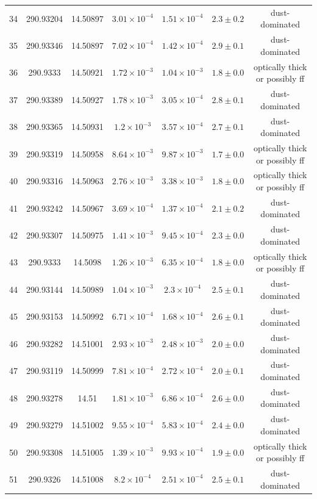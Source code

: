 \begin{table}
\begin{tabular}{ccccccc}
34 & 290.93204 & 14.50897 & $3.01\times10^{-4}$ & $1.51\times10^{-4}$ & $2.3\pm0.2$ & dust-dominated \\
35 & 290.93346 & 14.50897 & $7.02\times10^{-4}$ & $1.42\times10^{-4}$ & $2.9\pm0.1$ & dust-dominated \\
36 & 290.9333 & 14.50921 & $1.72\times10^{-3}$ & $1.04\times10^{-3}$ & $1.8\pm0.0$ & optically thick or possibly ff \\
37 & 290.93389 & 14.50927 & $1.78\times10^{-3}$ & $3.05\times10^{-4}$ & $2.8\pm0.1$ & dust-dominated \\
38 & 290.93365 & 14.50931 & $1.2\times10^{-3}$ & $3.57\times10^{-4}$ & $2.7\pm0.1$ & dust-dominated \\
39 & 290.93319 & 14.50958 & $8.64\times10^{-3}$ & $9.87\times10^{-3}$ & $1.7\pm0.0$ & optically thick or possibly ff \\
40 & 290.93316 & 14.50963 & $2.76\times10^{-3}$ & $3.38\times10^{-3}$ & $1.8\pm0.0$ & optically thick or possibly ff \\
41 & 290.93242 & 14.50967 & $3.69\times10^{-4}$ & $1.37\times10^{-4}$ & $2.1\pm0.2$ & dust-dominated \\
42 & 290.93307 & 14.50975 & $1.41\times10^{-3}$ & $9.45\times10^{-4}$ & $2.3\pm0.0$ & dust-dominated \\
43 & 290.9333 & 14.5098 & $1.26\times10^{-3}$ & $6.35\times10^{-4}$ & $1.8\pm0.0$ & optically thick or possibly ff \\
44 & 290.93144 & 14.50989 & $1.04\times10^{-3}$ & $2.3\times10^{-4}$ & $2.5\pm0.1$ & dust-dominated \\
45 & 290.93153 & 14.50992 & $6.71\times10^{-4}$ & $1.68\times10^{-4}$ & $2.6\pm0.1$ & dust-dominated \\
46 & 290.93282 & 14.51001 & $2.93\times10^{-3}$ & $2.48\times10^{-3}$ & $2.0\pm0.0$ & dust-dominated \\
47 & 290.93119 & 14.50999 & $7.81\times10^{-4}$ & $2.72\times10^{-4}$ & $2.0\pm0.1$ & dust-dominated \\
48 & 290.93278 & 14.51 & $1.81\times10^{-3}$ & $6.86\times10^{-4}$ & $2.6\pm0.0$ & dust-dominated \\
49 & 290.93279 & 14.51002 & $9.55\times10^{-4}$ & $5.83\times10^{-4}$ & $2.4\pm0.0$ & dust-dominated \\
50 & 290.93308 & 14.51005 & $1.39\times10^{-3}$ & $9.93\times10^{-4}$ & $1.9\pm0.0$ & optically thick or possibly ff \\
51 & 290.9326 & 14.51008 & $8.2\times10^{-4}$ & $2.51\times10^{-4}$ & $2.5\pm0.1$ & dust-dominated \\

\end{tabular}
\end{table}
